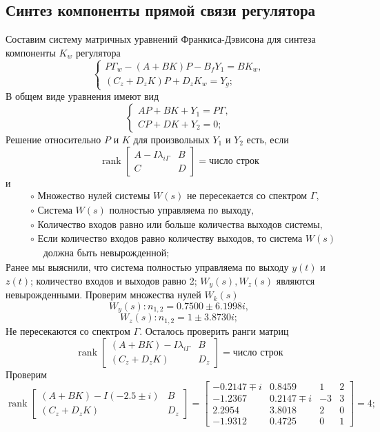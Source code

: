 \documentclass[a4paper, 12pt]{article}
\begin{document}
    \subsection{Синтез компоненты прямой связи регулятора}
    Составим систему матричных уравнений Франкиса-Дэвисона
    для синтеза компоненты $K_w$ регулятора
    $$
    \begin{cases}
        P\Gamma_w-\left( A+BK \right)P-B_fY_1=BK_w,\\
        \left( C_z+D_zK \right)P+D_zK_w=Y_g;
    \end{cases}
    $$
    В общем виде уравнения имеют вид
    $$
    \begin{cases}
        AP+BK+Y_1=P\Gamma,\\
        CP+DK+Y_2=0;
    \end{cases}
    $$
    Решение относительно $P$ и $K$ для произвольных $Y_1$ и $Y_2$
    есть, если
    $$
    \operatorname{rank}\begin{bmatrix}
        A-I\lambda_{i\Gamma} &B\\
        C &D
    \end{bmatrix}=\text{число строк}
    $$
    и
    \begin{align*}
        &\circ\text{ Множество нулей системы } W(s) \text{ не пересекается со спектром }\Gamma,\\
        &\circ\text{ Система }W(s)\text{ полностью управляема по выходу},\\
        &\circ\text{ Количество входов равно или больше количества выходов системы},\\
        &\circ\text{ Если количество входов равно количеству выходов, то система }W(s)\\
        &\,\,\,\,\,\,\text{ должна быть невырожденной};
    \end{align*}
    Ранее мы выяснили, что система полностью управляема по выходу $y(t)$ и $z(t)$; количество входов и выходов равно 2;
    $W_y(s),W_z(s)$ являются невырожденными. Проверим множества нулей $W_k(s)$
    $$
    W_y(s): n_{1,2}=0.7500 \pm 6.1998i,
    $$
    $$
    W_z(s): n_{1,2}=1 \pm 3.8730i;
    $$
    Не пересекаются со спектром $\Gamma$. Осталось проверить ранги матриц
    $$
    \operatorname{rank}\begin{bmatrix}
        \left( A+BK \right)-I\lambda_{i\Gamma} &B\\
        \left( C_z+D_zK \right) &D_z
    \end{bmatrix}=\text{число строк}
    $$
    Проверим
    $$
    \operatorname{rank}\begin{bmatrix}
        \left( A+BK \right)-I\left( -2.5\pm i \right) &B\\
        \left( C_z+D_zK \right) &D_z
    \end{bmatrix}=\begin{bmatrix}
    -0.2147\mp i   &0.8459   &1    &2 \\
  -1.2367    &0.2147\mp i  &-3    &3 \\
   2.2954    &3.8018    &2   & 0 \\
  -1.9312    &0.4725    &0    &1 
    \end{bmatrix}=4;
    $$
\end{document}
